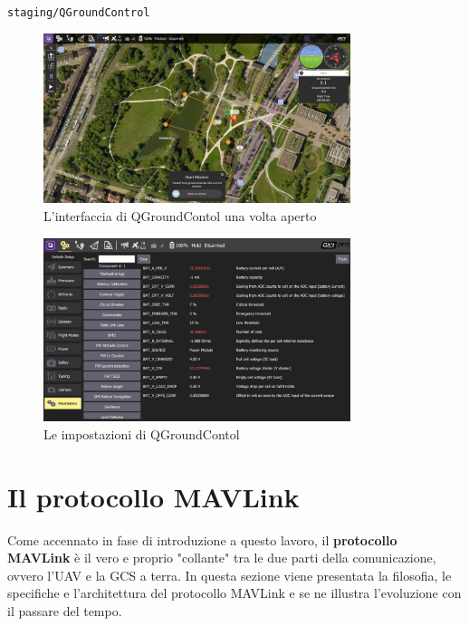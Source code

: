 \documentclass[a4paper, 12pt, oneside]{article}
\theoremstyle{definition}
\begin{document}
\begin{center}
    \texttt{staging/QGroundControl}
\end{center}

\begin{figure}[H]
    \centering
    \includegraphics[width=0.8\textwidth]{images/QGroundCotrol-Interface.jpg}
    \caption{L'interfaccia di QGroundContol una volta aperto}
\end{figure}

\begin{figure}[H]
    \centering
    \includegraphics[width=0.8\textwidth]{images/QGroundControl-settings.jpg}
    \caption{Le impostazioni di QGroundContol}
\end{figure}

\section{Il protocollo MAVLink}

Come accennato in fase di introduzione a questo lavoro, il \textbf{protocollo MAVLink} è il vero e proprio "collante" tra le due parti della comunicazione, ovvero l'UAV e la GCS a terra. In questa sezione viene presentata la filosofia, le specifiche e l'architettura del protocollo MAVLink e se ne illustra l'evoluzione con il passare del tempo.
\end{document}
